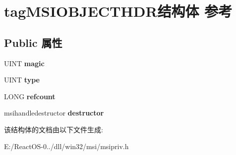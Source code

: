\hypertarget{structtag_m_s_i_o_b_j_e_c_t_h_d_r}{}\section{tag\+M\+S\+I\+O\+B\+J\+E\+C\+T\+H\+D\+R结构体 参考}
\label{structtag_m_s_i_o_b_j_e_c_t_h_d_r}
\subsection*{Public 属性}
\begin{DoxyCompactItemize}
\item 
\mbox{\label{structtag_m_s_i_o_b_j_e_c_t_h_d_r_a31c7d28cb383660720fa74f339d41488}} 
U\+I\+NT {\bfseries magic}
\item 
\mbox{\label{structtag_m_s_i_o_b_j_e_c_t_h_d_r_a301d010c6cb346162af78e7cd4c1eeb1}} 
U\+I\+NT {\bfseries type}
\item 
\mbox{\label{structtag_m_s_i_o_b_j_e_c_t_h_d_r_aa92eaed236776d1c0e8a96b9b29c4cd7}} 
L\+O\+NG {\bfseries refcount}
\item 
\mbox{\label{structtag_m_s_i_o_b_j_e_c_t_h_d_r_aef7eab44a4d27b3554837cfd58f6d5c6}} 
msihandledestructor {\bfseries destructor}
\end{DoxyCompactItemize}


该结构体的文档由以下文件生成\+:\begin{DoxyCompactItemize}
\item 
E\+:/\+React\+O\+S-\/0../dll/win32/msi/msipriv.\+h\end{DoxyCompactItemize}
